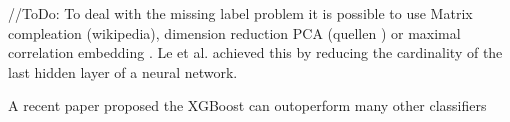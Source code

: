 //ToDo:
To deal with the missing label problem it is possible to use
Matrix compleation (wikipedia),
dimension reduction PCA (quellen )
or maximal correlation embedding \cite{Li19}. Le et al. achieved this by reducing the cardinality of the last hidden layer of a neural network. 

A recent paper proposed the XGBoost can outoperform many other classifiers \cite{Zhang19}
